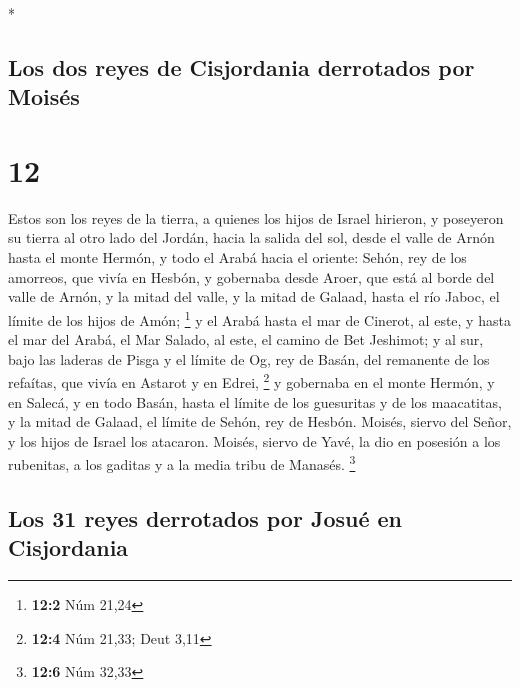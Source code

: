 \begin{paracol}{2}
\begin{otherlanguage}{english}
\end{otherlanguage}

\switchcolumn[0]*

\hypertarget{los-dos-reyes-de-cisjordania-derrotados-por-moisuxe9s}{%
\subsection{Los dos reyes de Cisjordania derrotados por
Moisés}\label{los-dos-reyes-de-cisjordania-derrotados-por-moisuxe9s}}

\hypertarget{section-22}{%
\section{12}\label{section-22}}

 Estos son los reyes de la tierra, a quienes los hijos de
Israel hirieron, y poseyeron su tierra al otro lado del Jordán, hacia la
salida del sol, desde el valle de Arnón hasta el monte Hermón, y todo el
Arabá hacia el oriente:  Sehón, rey de los amorreos, que
vivía en Hesbón, y gobernaba desde Aroer, que está al borde del valle de
Arnón, y la mitad del valle, y la mitad de Galaad, hasta el río Jaboc,
el límite de los hijos de Amón; \footnote{\textbf{12:2} Núm 21,24}
 y el Arabá hasta el mar de Cinerot, al este, y hasta el
mar del Arabá, el Mar Salado, al este, el camino de Bet Jeshimot; y al
sur, bajo las laderas de Pisga  y el límite de Og, rey de
Basán, del remanente de los refaítas, que vivía en Astarot y en Edrei,
\footnote{\textbf{12:4} Núm 21,33; Deut 3,11}  y gobernaba
en el monte Hermón, y en Salecá, y en todo Basán, hasta el límite de los
guesuritas y de los maacatitas, y la mitad de Galaad, el límite de
Sehón, rey de Hesbón.  Moisés, siervo del Señor, y los
hijos de Israel los atacaron. Moisés, siervo de Yavé, la dio en posesión
a los rubenitas, a los gaditas y a la media tribu de Manasés.
\footnote{\textbf{12:6} Núm 32,33}

\hypertarget{los-31-reyes-derrotados-por-josuuxe9-en-cisjordania}{%
\subsection{Los 31 reyes derrotados por Josué en
Cisjordania}\label{los-31-reyes-derrotados-por-josuuxe9-en-cisjordania}}


\end{paracol}

